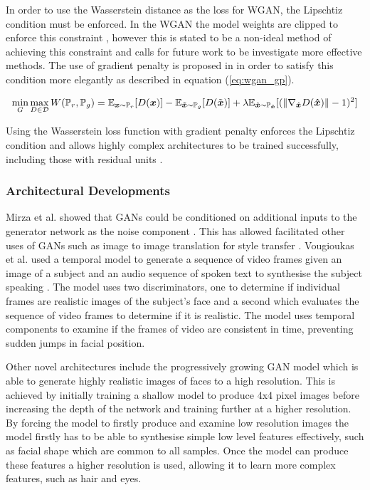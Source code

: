 \documentclass[12pt]{article}
\begin{document}
In order to use the Wasserstein distance as the loss for WGAN, the Lipschtiz condition must be enforced.
In the WGAN the model weights are clipped to enforce this constraint \cite{Arjovsky2017}, however this is stated to be a non-ideal method of achieving this constraint and calls for future work to be investigate more effective methods.
The use of gradient penalty is proposed in \cite{Gulrajani2017} in order to satisfy this condition more elegantly as described in equation (\ref{eq:wgan_gp}).

\begin{equation} \label{eq:wgan_gp}
    \min_{G} \max_{D \in \mathcal{D}} W(\mathbb{P}_{r}, \mathbb{P}_{g}) 
        = \mathbb{E}_{{\boldsymbol{{x}}} \sim \mathbb{P}_{r}} [D({\boldsymbol{{x}}})]
        - \mathbb{E}_{{\boldsymbol{{\tilde{x}}}} \sim \mathbb{P}_{g}} [D(\tilde{{{\boldsymbol{{x}}}}})]
        + \lambda \mathbb{E}_{{\boldsymbol{{\hat{x}}}} \sim \mathbb{P}_{{\boldsymbol{{\hat{x}}}}}} 
            [(\| \nabla_{{\boldsymbol{{\hat{x}}}}} D({\boldsymbol{{\hat{x}}}}) \| - 1)^2]
\end{equation}
\quad

\noindent Using the Wasserstein loss function with gradient penalty enforces the Lipschtiz condition and allows highly complex architectures to be trained successfully, including those with residual units \cite{Gulrajani2017}.

\subsubsection{Architectural Developments}
Mirza et al. showed that GANs could be conditioned on additional inputs to the generator network as the noise component \cite{Mirza2014}.
This has allowed facilitated other uses of GANs such as image to image translation for style transfer \cite{Zhu2017}.
Vougioukas et al. used a temporal model to generate a sequence of video frames given an image of a subject and an audio sequence of spoken text to synthesise the subject speaking \cite{Vougioukas2018}.
The model uses two discriminators, one to determine if individual frames are realistic images of the subject's face and a second which evaluates the sequence of video frames to determine if it is realistic.
The model uses temporal components to examine if the frames of video are consistent in time, preventing sudden jumps in facial position.

Other novel architectures include the progressively growing GAN model \cite{Karras2017b} which is able to generate highly realistic images of faces to a high resolution.
This is achieved by initially training a shallow model to produce 4x4 pixel images before increasing the depth of the network and training further at a higher resolution.
By forcing the model to firstly produce and examine low resolution images the model firstly has to be able to synthesise simple low level features effectively, such as facial shape which are common to all samples.
Once the model can produce these features a higher resolution is used, allowing it to learn more complex features, such as hair and eyes.
\end{document}
